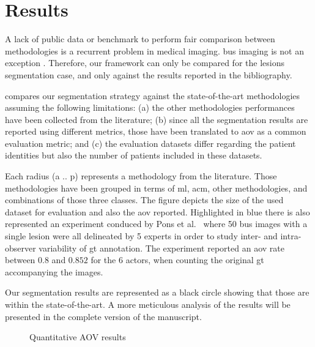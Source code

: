 \graphicspath{ {./content/results/figures/} }

\section{Results} 
A lack of public data or benchmark to perform fair comparison between methodologies is a recurrent problem in medical imaging.
\ac{bus} imaging is not an exception \cite{Cheng:2009p10580}. 
Therefore, our framework can only be compared for the lesions segmentation case, and only against the results reported in the bibliography.

 compares our segmentation strategy against the state-of-the-art methodologies assuming the following limitations:
(a) the other methodologies performances have been collected from the literature; (b) since all the segmentation results are reported using different metrics, those have been translated to \ac{aov} as a common evaluation metric; and (c) the evaluation datasets differ regarding the patient identities but also the number of patients included in these datasets.

Each radius (a .. p) represents a methodology from the literature.
Those methodologies have been grouped in terms of \ac{ml}, \ac{acm}, other methodologies, and combinations of those three classes.
The figure depicts the size of the used dataset for evaluation and also the \ac{aov} reported. 
Highlighted in blue there is also represented an experiment conduced by Pons et al.~\cite{gerard2013} where 50 \ac{bus} images with a single lesion were all delineated by 5 experts in order to study inter- and intra-observer variability of \ac{gt} annotation. 
The experiment reported an \ac{aov} rate between $0.8$ and $0.852$ for the 6 actors, when counting the original \ac{gt} accompanying the images.

Our segmentation results are represented as a black circle showing that those are within the state-of-the-art. 
A more meticulous analysis of the results will be presented in the complete version of the manuscript.

\begin{figure}[h]
  \centering
  
  \caption{Quantitative AOV results}
  \label{fig:surveyResults}
\end{figure}


